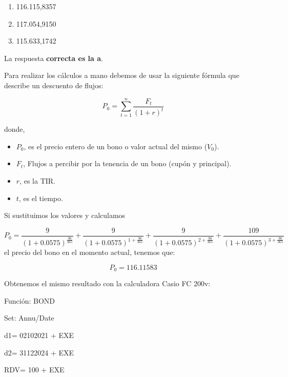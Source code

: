 \documentclass[
  letterpaper,
  DIV=11,
  numbers=noendperiod]{scrreprt}
\begin{document}
\begin{tcolorbox}
\begin{enumerate}
\def\labelenumi{\alph{enumi}.}
\item
  116.115,8357
\item
  117.054,9150
\item
  115.633,1742
\end{enumerate}

\begin{tcolorbox}[enhanced jigsaw, toprule=.15mm, left=2mm, breakable, opacitybacktitle=0.6, toptitle=1mm, coltitle=black, arc=.35mm, leftrule=.75mm, bottomtitle=1mm, titlerule=0mm, title=\textcolor{quarto-callout-tip-color}{\faLightbulb}\hspace{0.5em}{Solución}, rightrule=.15mm, opacityback=0, bottomrule=.15mm, colback=white, colframe=quarto-callout-tip-color-frame, colbacktitle=quarto-callout-tip-color!10!white]

La respuesta \textbf{correcta es la a}.

Para realizar los cálculos a mano debemos de usar la siguiente fórmula
que describe un descuento de flujos:

\[P_0=\sum_{ t=1}^{ n}\frac{F_t}{(1+r)^{t}}\]

donde,

\begin{itemize}
\item
  \(P_0\), es el precio entero de un bono o valor actual del mismo
  (\(V_0\)).
\item
  \(F_t\), Flujos a percibir por la tenencia de un bono (cupón y
  principal).
\item
  \(r\), es la TIR.
\item
  \(t\), es el tiempo.
\end{itemize}

Si sustituimos los valores y calculamos

\[P_0=\frac{9}{\left(1+0.0575\right)^{\frac{90}{365}}}+\frac{9}{\left(1+0.0575\right)^{1+\frac{90}{365}}}+\frac{9}{\left(1+0.0575\right)^{2+\frac{90}{365}}}+\frac{109}{\left(1+0.0575\right)^{3+\frac{90}{365}}}\]
el precio del bono en el momento actual, tenemos que:

\[P_0=116.11583\]

Obtenemos el mismo resultado con la calculadora Casio FC 200v:

Función: BOND

Set: Annu/Date

d1= 02102021 + EXE

d2= 31122024 + EXE

RDV= 100 + EXE


\end{tcolorbox}
\end{tcolorbox}
\end{document}
